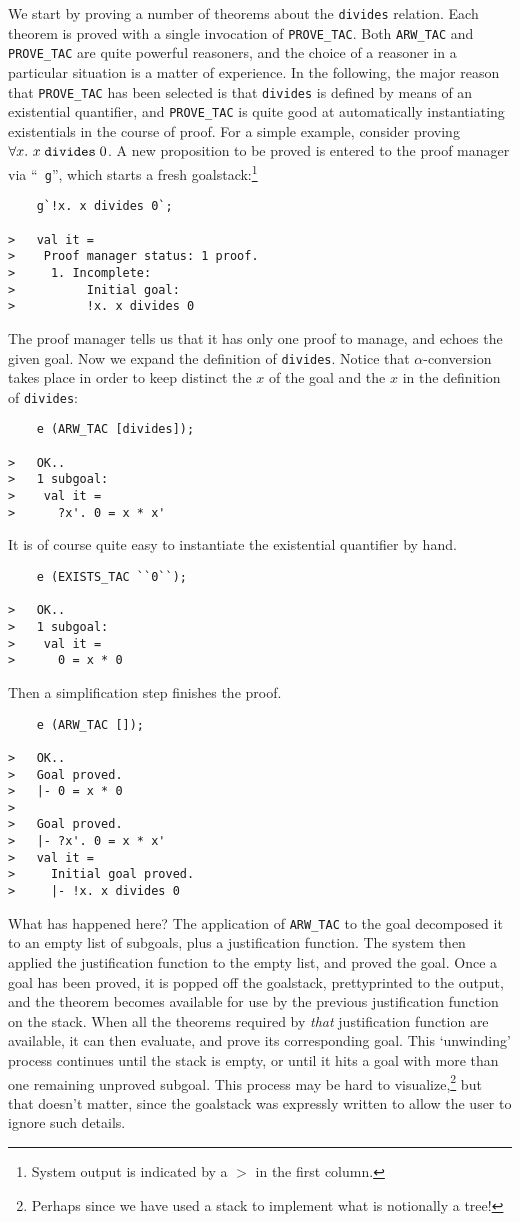 \documentclass[12pt,fleqn,a4paper]{report}
\begin{document}
We start by proving a number of theorems about the \verb+divides+
relation. Each theorem is proved with a single invocation of
\verb+PROVE_TAC+. Both
\verb+ARW_TAC+ and \verb+PROVE_TAC+ are quite powerful reasoners, and
the choice of a reasoner in a particular situation is a matter of
experience. In the following, the major reason that \verb+PROVE_TAC+ has
been selected is that \verb+divides+ is defined by means of an existential
quantifier, and \verb+PROVE_TAC+ is quite good at automatically
instantiating existentials in the course of proof. For a simple example,
consider proving $\forall x.\ x\; \mbox{\tt divides}\; 0$. A new
proposition to be proved is entered to the proof manager via ``{\tt
g}'', which starts a fresh goalstack:\footnote{System output is indicated
by a {\tt $>$} in the first column.}
{\small\begin{verbatim}
    g`!x. x divides 0`;

>   val it =
>    Proof manager status: 1 proof.
>     1. Incomplete:
>          Initial goal:
>          !x. x divides 0
\end{verbatim}}
The proof manager tells us that it has only one proof to manage, and
echoes the given goal. Now we expand the definition of
\verb+divides+. Notice that $\alpha$-conversion takes place in order to
keep distinct the $x$ of the goal and the $x$ in the definition of
\verb+divides+:
{\small\begin{verbatim}
    e (ARW_TAC [divides]);

>   OK..
>   1 subgoal:
>    val it =
>      ?x'. 0 = x * x'
\end{verbatim}}
It is of course quite easy to instantiate the existential quantifier by
hand.
{\small\begin{verbatim}
    e (EXISTS_TAC ``0``);

>   OK..
>   1 subgoal:
>    val it =
>      0 = x * 0
\end{verbatim}}

Then a simplification step finishes the proof.
{\small\begin{verbatim}
    e (ARW_TAC []);

>   OK..
>   Goal proved.
>   |- 0 = x * 0
>
>   Goal proved.
>   |- ?x'. 0 = x * x'
>   val it =
>     Initial goal proved.
>     |- !x. x divides 0
\end{verbatim}}
What has happened here? The application of \verb+ARW_TAC+ to the goal
decomposed it to an empty list of subgoals, plus a justification
function. The system then applied the justification function to
the empty list, and proved the goal. Once a goal has been proved, it is
popped off the goalstack, prettyprinted to the output, and the theorem
becomes available for use by the previous justification function on the
stack. When all the theorems required by {\it that\/} justification
function are available, it can then evaluate, and prove its
corresponding goal. This `unwinding' process continues until the stack
is empty, or until it hits a goal with more than one remaining unproved
subgoal. This process may be hard to visualize,\footnote{Perhaps since we
have used a stack to implement what is notionally a tree!} but that doesn't
matter, since the goalstack was expressly written to allow the user to
ignore such details.
\end{document}
